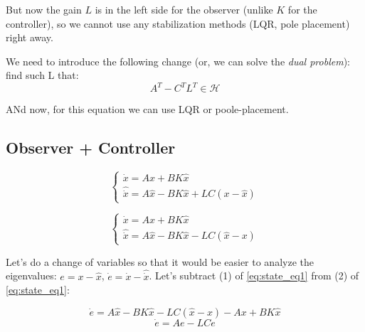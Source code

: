 But now the gain $L$ is in the left side for the  observer (unlike $K$ for the controller), so we cannot use any stabilization methods
(LQR, pole placement) right away. 

We need to introduce the following change (or, we can solve the \textit{dual problem}):
find such L that:
\[A^T - C^TL^T \in \mathcal{H}\]

ANd  now, for this equation we can use LQR or poole-placement. 


\subsection{Observer + Controller}




\[
\begin{cases}
    \dot x = Ax + BK \hat x \\
    \hat \dot x = A \hat x - BK \hat x + LC(x - \hat x)
\end{cases}
\]


\begin{equation}
    \begin{cases}
        \dot x = Ax + BK \hat x \label{eq:state_eq1} \\
        \hat \dot x = A \hat x - BK \hat x - LC(\hat x - x) 
    \end{cases}
\end{equation}



Let's do a change of variables so that it would be easier to analyze the eigenvalues:
$e = x - \hat x$, $\dot e = \dot x - \hat \dot x$. 
Let's subtract (1) of  \ref{eq:state_eq1} from (2) of \ref{eq:state_eq1}:

\[\dot e = A \hat x - BK \hat x - LC(\hat x - x) - Ax + BK \hat x \]
\[\dot e = A e - LCe\]

